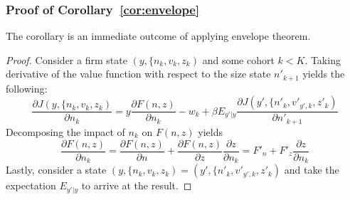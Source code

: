 \subsubsection*{Proof of Corollary~\ref{cor:envelope}} \label{proof:envelope}
The corollary is an immediate outcome of applying envelope theorem.
\begin{proof}
    Consider a firm state $(y,\{n_k,v_k,z_k)$ and some cohort $k<K$. Taking derivative of the value function with respect to the size state $n'_{k+1}$ yields the following:
\[\frac{\partial J(y,\{n_k,v_k,z_k)}{\partial n_k} = y \frac{\partial F(n,z)}{\partial n_k} - w_k + \beta E_{y'|y} \frac{\partial J(y',\{n'_k,v'_{y',k},z'_k)}{\partial n'_{k+1}}\]
Decomposing the impact of $n_k$ on $F(n,z)$ yields
\[ \frac{\partial F(n,z)}{\partial n_k} = \frac{\partial F(n,z)}{\partial n} + \frac{\partial F(n,z)}{\partial z}\frac{\partial z}{\partial n_k}= F'_n + F'_z \frac{\partial z}{\partial n_k}\]
Lastly, consider a state $(y,\{n_k,v_k,z_k)= (y',\{n'_k,v'_{y',k},z'_k)$ and take the expectation $E_{y'|y}$ to arrive at the result.
\end{proof}

